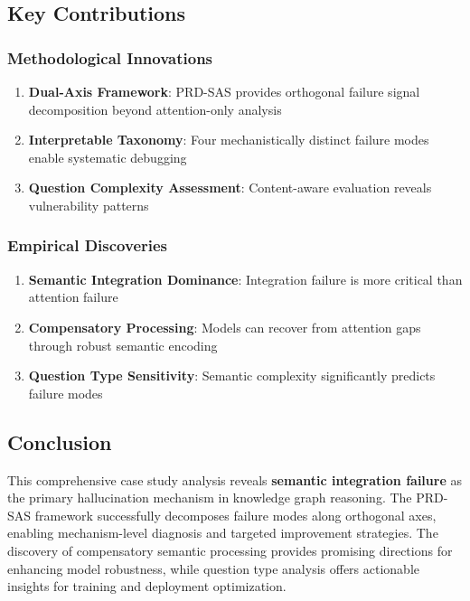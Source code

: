 \subsection{Key Contributions}

\subsubsection{Methodological Innovations}
\begin{enumerate}
    \item \textbf{Dual-Axis Framework}: PRD-SAS provides orthogonal failure signal decomposition beyond attention-only analysis
    \item \textbf{Interpretable Taxonomy}: Four mechanistically distinct failure modes enable systematic debugging
    \item \textbf{Question Complexity Assessment}: Content-aware evaluation reveals vulnerability patterns
\end{enumerate}

\subsubsection{Empirical Discoveries}
\begin{enumerate}
    \item \textbf{Semantic Integration Dominance}: Integration failure is more critical than attention failure
    \item \textbf{Compensatory Processing}: Models can recover from attention gaps through robust semantic encoding
    \item \textbf{Question Type Sensitivity}: Semantic complexity significantly predicts failure modes
\end{enumerate}

\subsection{Conclusion}

This comprehensive case study analysis reveals \textbf{semantic integration failure} as the primary hallucination mechanism in knowledge graph reasoning. The PRD-SAS framework successfully decomposes failure modes along orthogonal axes, enabling mechanism-level diagnosis and targeted improvement strategies. The discovery of compensatory semantic processing provides promising directions for enhancing model robustness, while question type analysis offers actionable insights for training and deployment optimization.

